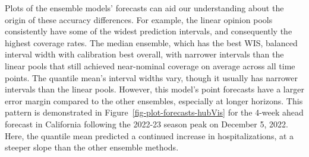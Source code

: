 \documentclass[
]{article}
\begin{document}
Plots of the ensemble models' forecasts can aid our understanding about
the origin of these accuracy differences. For example, the linear
opinion pools consistently have some of the widest prediction intervals,
and consequently the highest coverage rates. The median ensemble, which
has the best WIS, balanced interval width with calibration best overall,
with narrower intervals than the linear pools that still achieved
near-nominal coverage on average across all time points. The quantile
mean's interval widths vary, though it usually has narrower intervals
than the linear pools. However, this model's point forecasts have a
larger error margin compared to the other ensembles, especially at
longer horizons. This pattern is demonstrated in
Figure~\ref{fig-plot-forecasts-hubVis} for the 4-week ahead forecast in
California following the 2022-23 season peak on December 5, 2022. Here,
the quantile mean predicted a continued increase in hospitalizations, at
a steeper slope than the other ensemble methods.
\end{document}
